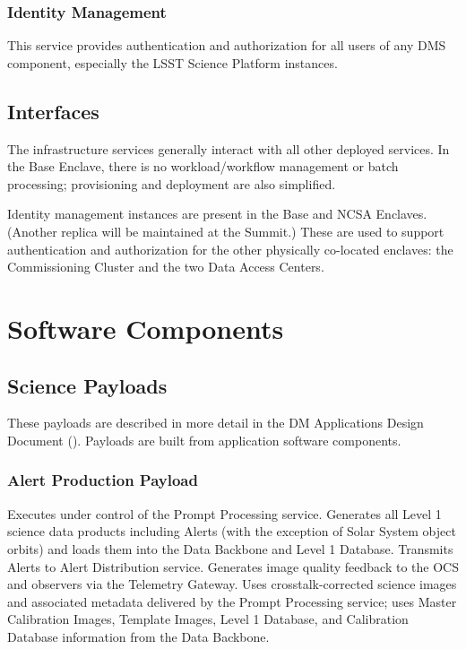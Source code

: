 \documentclass[DM,lsstdraft,toc]{lsstdoc}
\begin{document}
\subsubsection{Identity Management}\label{identity-management}

This service provides authentication and authorization for all users of
any DMS component, especially the LSST Science Platform instances.

\subsection{Interfaces}\label{infrastructure-interfaces}

The infrastructure services generally interact with all other deployed
services.  In the Base Enclave, there is no workload/workflow management or
batch processing; provisioning and deployment are also simplified.

Identity management instances are present in the Base and NCSA Enclaves.
(Another replica will be maintained at the Summit.)  These are used to support
authentication and authorization for the other physically co-located enclaves:
the Commissioning Cluster and the two Data Access Centers.


\section{Software Components}\label{software-components}

\subsection{Science Payloads}\label{science-payloads}

These payloads are described in more detail in the DM Applications Design
Document (). Payloads are built from application software
components.

\subsubsection{Alert Production Payload}\label{alert-production-payload}

Executes under control of the Prompt Processing service. Generates all
Level 1 science data products including Alerts (with the exception of
Solar System object orbits) and loads them into the Data Backbone and
Level 1 Database. Transmits Alerts to Alert Distribution service.
Generates image quality feedback to the OCS and observers via the
Telemetry Gateway. Uses crosstalk-corrected science images and
associated metadata delivered by the Prompt Processing service; uses
Master Calibration Images, Template Images, Level 1 Database, and
Calibration Database information from the Data Backbone.
\end{document}
